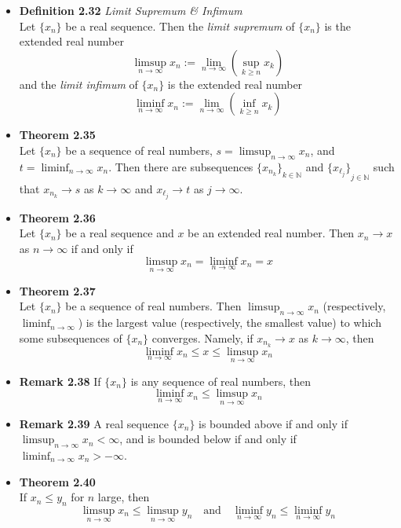\documentclass[11pt,a4paper]{article}
\begin{document}
\begin{itemize}
    \item \textbf{Definition 2.32} \emph{Limit Supremum \& Infimum} \\
        Let $\{x_n\}$ be a real sequence.
        Then the \emph{limit supremum} of $\{x_n\}$ is the extended real number
        \[
            \limsup_{n \to \infty} x_n := \lim_{n \to \infty} (\sup_{k \geq n} x_k)
        \]
        and the \emph{limit infimum} of $\{x_n\}$ is the extended real number
        \[
            \liminf_{n \to \infty} x_n := \lim_{n \to \infty} (\inf_{k \geq n} x_k)
        \]

    \item \textbf{Theorem 2.35} \\
        Let $\{x_n\}$ be a sequence of real numbers, $s = \limsup_{n \to \infty} x_n$,
        and $t = \liminf_{n \to \infty} x_n$.
        Then there are subsequences ${\{x_n_k\}}_{k \in \mathbb{N}}$ and
        ${\{x_\ell_j\}}_{j \in \mathbb{N}}$ such that
        $x_n_k \to s$ as $k \to \infty$ and $x_\ell_j \to t$ as $j \to \infty$.

    \item \textbf{Theorem 2.36} \\
        Let $\{x_n\}$ be a real sequence and $x$ be an extended real number.
        Then $x_n \to x$ as $n \to \infty$ if and only if
        \[
            \limsup_{n \to \infty} x_n = \liminf_{n \to \infty} x_n = x
        \]

    \item \textbf{Theorem 2.37} \\
        Let $\{x_n\}$ be a sequence of real numbers.
        Then $\limsup_{n \to \infty} x_n$ (respectively, $\liminf_{n \to \infty}$) is the
        largest value (respectively, the smallest value) to which some subsequences of
        $\{x_n\}$ converges.
        Namely, if $x_n_k \to x$ as $k \to \infty$, then
        \[
            \liminf_{n \to \infty} x_n \leq x \leq \limsup_{n \to \infty} x_n
        \]

    \item \textbf{Remark 2.38}
        If $\{x_n\}$ is any sequence of real numbers, then
        \[
            \liminf_{n \to \infty} x_n \leq \limsup_{n \to \infty} x_n
        \]

    \item \textbf{Remark 2.39}
        A real sequence $\{x_n\}$ is bounded above if and only if
        $\limsup_{n \to \infty} x_n < \infty$, and is bounded below if and only if
        $\liminf_{n \to \infty} x_n > -\infty$.

    \item \textbf{Theorem 2.40} \\
        If $x_n \leq y_n$ for $n$ large, then
        \[
            \limsup_{n \to \infty} x_n \leq \limsup_{n \to \infty} y_n \quad \text{and} \quad
            \liminf_{n \to \infty} y_n \leq \liminf_{n \to \infty} y_n
        \]

\end{itemize}
\end{document}
